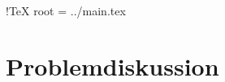  !TeX root = ../main.tex

\chapter{Problemdiskussion}\label{chapter:dimensionwise_refinement}

			
	
		
		
